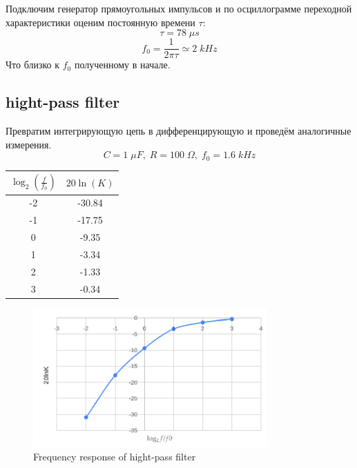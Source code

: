 \documentclass{article}
\begin{document}
Подключим генератор прямоугольных импульсов и по осциллограмме переходной характеристики
оценим постоянную времени \(\tau\):
\[\tau = 78\;\mu s\]
\[f_0 = \frac{1}{2\pi\tau}\simeq 2\; kHz\]
Что близко к \(f_0\) полученному в начале.
\subsection{hight-pass filter}
Превратим интегрирующую цепь в дифференцирующую и проведём аналогичные измерения.
\[C = 1\;\mu F,\; R = 100\;\Omega,\; f_0 = 1.6\;kHz\]

\begin{table}[H]
    \centering
    \begin{tabular}{|c|c|}
    \hline
    \(\log_2\left(\frac{f}{f_0}\right)\)&\(20\ln(K)\)\\\hline
    -2 & -30.84 \\\hline
    -1 & -17.75 \\\hline
    0  & -9.35  \\\hline
    1  & -3.34  \\\hline
    2  & -1.33  \\\hline
    3  & -0.34  \\\hline
    \end{tabular}
\end{table}

\begin{figure}[H]
    \centering
    \includegraphics[width=0.8\textwidth]{18.2.png}
    \caption{Frequency response of hight-pass filter }
\end{figure}
\end{document}

